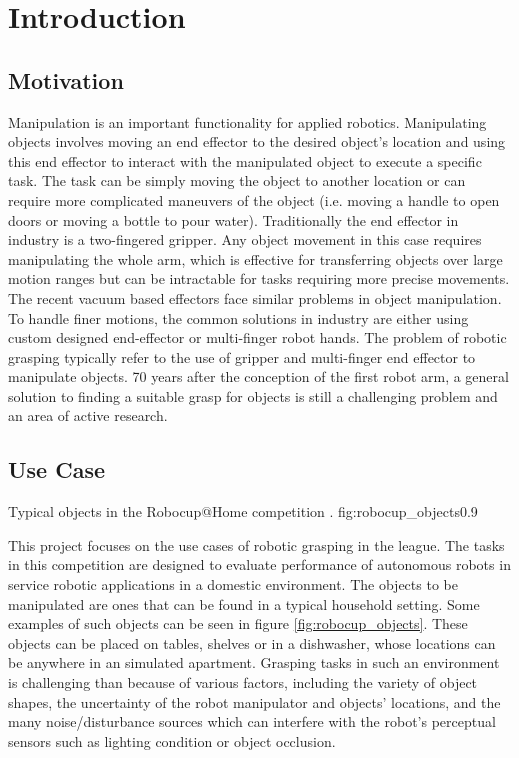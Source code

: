\pagebreak
\section{Introduction}

\subsection{Motivation}
Manipulation is an important functionality for applied robotics. Manipulating objects involves moving an end effector
to the desired object's location and using this end effector to interact with the manipulated object to execute a
specific task. The task can be simply moving the object to another location or can require more complicated maneuvers
of the object (i.e. moving a handle to open doors or moving a bottle to pour water). Traditionally the end effector in
industry is a two-fingered gripper. Any object movement in this case requires manipulating the whole arm, which is
effective for transferring objects over large motion ranges but can be intractable for tasks requiring more precise
movements. The recent vacuum based effectors face similar problems in object manipulation. To handle finer motions, the
common solutions in industry are either using custom designed end-effector or multi-finger robot hands. The problem of
robotic grasping typically refer to the use of gripper and multi-finger end effector to manipulate objects. 70 years after
the conception of the first robot arm, a general solution to finding a suitable grasp for objects is still a challenging
problem and an area of active research.

\subsection{Use Case}
{Typical objects in the Robocup@Home competition \cite{robocupRulebook2018}.}
{fig:robocup_objects}{0.9\textwidth}

This project focuses on the use cases of robotic grasping in the
 league. The tasks in this competition are designed to
evaluate performance of autonomous robots in service robotic applications in a domestic environment. The objects to be
manipulated are ones that can be found in a typical household setting. Some examples of such objects can be seen in
figure \ref{fig:robocup_objects}. These objects can be placed on tables, shelves or in a dishwasher, whose locations
can be anywhere in an simulated apartment. Grasping tasks in such an environment is challenging than because of various
factors, including the variety of object shapes, the uncertainty of the robot manipulator and objects' locations,
and the many noise/disturbance sources which can interfere with the robot's perceptual sensors such as lighting
condition or object occlusion.

